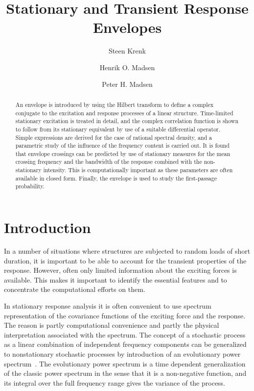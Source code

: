 \documentclass[12pt]{article}
\title{Stationary and Transient Response Envelopes}
\author[1]{Steen Krenk}
\author[2]{Henrik O. Madsen}
\author[1]{Peter H. Madsen}
\affil[1]{Risø National Laboratory, Roskilde, Denmark}
\affil[2]{Danish Engineering Academy, Lyngby, Denmark}
\date{}
\begin{document}
\maketitle

\begin{abstract}
An envelope is introduced by using the Hilbert transform to define a complex conjugate to the excitation and response processes of a linear structure. Time-limited stationary excitation is treated in detail, and the complex correlation function is shown to follow from its stationary equivalent by use of a suitable differential operator. Simple expressions are derived for the case of rational spectral density, and a parametric study of the influence of the frequency content is carried out. It is found that envelope crossings can be predicted by use of stationary measures for the mean crossing frequency and the bandwidth of the response combined with the non-stationary intensity. This is computationally important as these parameters are often available in closed form. Finally, the envelope is used to study the first-passage probability.
\end{abstract}

\section{Introduction}

In a number of situations where structures are subjected to random loads of short duration, it is important to be able to account for the transient properties of the response. However, often only limited information about the exciting forces is available. This makes it important to identify the essential features and to concentrate the computational efforts on them.

In stationary response analysis it is often convenient to use spectrum representation of the covariance functions of the exciting force and the response. The reason is partly computational convenience and partly the physical interpretation associated with the spectrum. The concept of a stochastic process as a linear combination of independent frequency components can be generalized to nonstationary stochastic processes by introduction of an evolutionary power spectrum~\cite{priestley1965,priestley1967}. The evolutionary power spectrum is a time dependent generalization of the classic power spectrum in the sense that it is a non-negative function, and its integral over the full frequency range gives the variance of the process.
\end{document}
